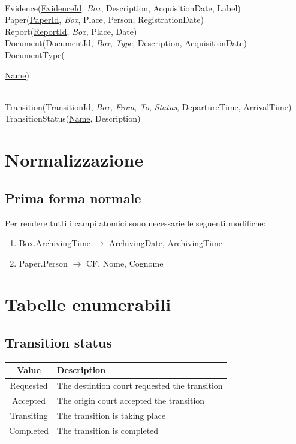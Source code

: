 \documentclass{article}
\begin{document}
\noindent \\
Evidence(\underline{EvidenceId}, \textit{Box}, Description, AcquisitionDate, Label) \\
Paper(\underline{PaperId}, \textit{Box}, Place, Person, RegistrationDate) \\
Report(\underline{ReportId}, \textit{Box}, Place, Date) \\
Document(\underline{DocumentId}, \textit{Box}, \textit{Type}, Description, AcquisitionDate) \\
DocumentType({\underline{Name})

\noindent \\
Transition(\underline{TransitionId}, \textit{Box}, \textit{From}, \textit{To}, \textit{Status}, DepartureTime, ArrivalTime) \\
TransitionStatus(\underline{Name}, Description)

\section{Normalizzazione}

\subsection{Prima forma normale}
Per rendere tutti i campi atomici sono necessarie le seguenti modifiche:
\begin{enumerate}
    \item Box.ArchivingTime $\rightarrow$ ArchivingDate, ArchivingTime
    \item Paper.Person $\rightarrow$ CF, Nome, Cognome
\end{enumerate}

\newpage
\section{Tabelle enumerabili}

\subsection{Transition status}
\begin{table}[h]
    \begin{center}
        \begin{tabular}{c|l}
            \toprule
            \textbf{Value} &
            \textbf{Description}                                           \\
            \midrule
            Requested      & The destintion court requested the transition \\
            Accepted       & The origin court accepted the transition      \\
            Transiting     & The transition is taking place                \\
            Completed      & The transition is completed                   \\
            \bottomrule
        \end{tabular}
    \end{center}
\end{table}

}
\end{document}
